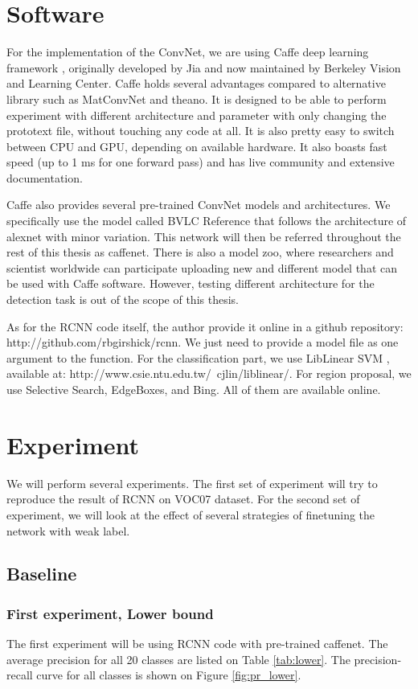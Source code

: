 \documentclass[a4paper,11pt]{kth-mag}
\begin{document}
\section{Software}
For the implementation of the ConvNet, we are using Caffe deep learning framework \cite{caffe}, originally developed by Jia and now maintained by Berkeley Vision and Learning Center. Caffe holds several advantages compared to alternative library such as MatConvNet and theano. It is designed to be able to perform experiment with different architecture and parameter with only changing the prototext file, without touching any code at all. It is also pretty easy to switch between CPU and GPU, depending on available hardware. It also boasts fast speed (up to 1 ms for one forward pass) and has live community and extensive documentation.

Caffe also provides several pre-trained ConvNet models and architectures. We specifically use the model called BVLC Reference that follows the architecture of alexnet with minor variation. This network will then be referred throughout the rest of this thesis as caffenet. There is also a model zoo, where researchers and scientist worldwide can participate uploading new and different model that can be used with Caffe software. However, testing different architecture for the detection task is out of the scope of this thesis.

As for the RCNN code itself, the author provide it online in a github repository: http://github.com/rbgirshick/rcnn. We just need to provide a model file as one argument to the function. For the classification part, we use LibLinear SVM \cite{liblinear}, available at: http://www.csie.ntu.edu.tw/~cjlin/liblinear/. For region proposal, we use Selective Search, EdgeBoxes, and Bing. All of them are available online.

\section{Experiment}
We will perform several experiments. The first set of experiment will try to reproduce the result of RCNN on VOC07 dataset. For the second set of experiment, we will look at the effect of several strategies of finetuning the network with weak label.

\subsection{Baseline}
\subsubsection{First experiment, Lower bound}
The first experiment will be using RCNN code with pre-trained caffenet. The average precision for all 20 classes are listed on Table \ref{tab:lower}. The precision-recall curve for all classes is shown on Figure \ref{fig:pr_lower}.
\end{document}
